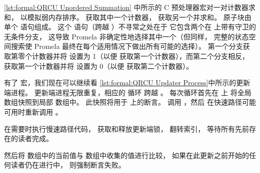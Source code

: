 \begin{fcvref}
\cref{lst:formal:QRCU Unordered Summation}
中所示的 C 预处理器宏对一对计数器求和，
以模拟弱内存排序。
 获取其中一个计数器，
 获取另一个并求和。
原子块由单个  语句组成。
这个  语句（跨越 ）不寻常之处在于
它包含两个在  上带有守卫的无条件分支，
这导致 Promela 非确定性地选择其中一个（但同样，
完整的状态空间搜索使 Promela 最终在每个适用情况下做出所有可能的选择）。
第一个分支获取第零个计数器并将  设置为 1（以便
 获取第一个计数器），而第二个分支相反，
获取第一个计数器并将  设置为 0（以便
 获取第二个计数器）。
\end{fcvref}

\QuickQuizEnd

\begin{listing}
\caption{QRCU 更新者进程}
\label{lst:formal:QRCU Updater Process}
\end{listing}

\begin{fcvref}
有了  宏，我们现在可以继续看
\cref{lst:formal:QRCU Updater Process}中所示的更新端进程。
更新端进程无限重复，相应的  循环
跨越 。
每次循环首先在  上
将全局  数组快照到局部  数组中。
此快照将用于  上的断言。
 调用 ，然后
在快速路径可能可用时重新调用 。

 在需要时执行慢速路径代码，
 获取和释放更新端锁，
 翻转索引，
 等待所有先前存在的读者完成。

 然后将 
数组中的当前值与  数组中收集的值进行比较，
如果在此更新之前开始的任何读者仍在进行中，
则强制断言失败。
\end{fcvref}

